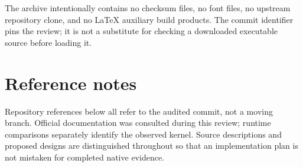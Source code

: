 \documentclass[11pt,a4paper]{article}
\newcommand{\code}[1]{\texttt{\detokenize{#1}}}
\begin{document}
The archive intentionally contains no checksum files, no font files, no upstream repository clone, and no LaTeX auxiliary build products. The commit identifier pins the review; it is not a substitute for checking a downloaded executable source before loading it.

\section{Reference notes}

Repository references below all refer to the audited commit, not a moving \code{main} branch. Official documentation was consulted during this review; runtime comparisons separately identify the observed kernel. Source descriptions and proposed designs are distinguished throughout so that an implementation plan is not mistaken for completed native evidence.
\end{document}
